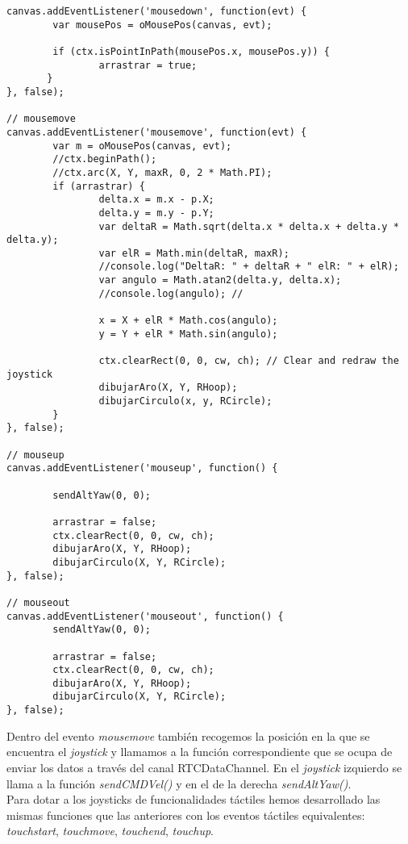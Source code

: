 \begin{lstlisting}[caption=Movimiento y control del joystick.]
canvas.addEventListener('mousedown', function(evt) {
        var mousePos = oMousePos(canvas, evt);

        if (ctx.isPointInPath(mousePos.x, mousePos.y)) {
                arrastrar = true;
       }
}, false);

// mousemove 
canvas.addEventListener('mousemove', function(evt) {
        var m = oMousePos(canvas, evt);
        //ctx.beginPath();
        //ctx.arc(X, Y, maxR, 0, 2 * Math.PI);
        if (arrastrar) {
                delta.x = m.x - p.X;
                delta.y = m.y - p.Y;
                var deltaR = Math.sqrt(delta.x * delta.x + delta.y * delta.y);
                var elR = Math.min(deltaR, maxR);
                //console.log("DeltaR: " + deltaR + " elR: " + elR);
                var angulo = Math.atan2(delta.y, delta.x);
                //console.log(angulo); //
                
                x = X + elR * Math.cos(angulo);
                y = Y + elR * Math.sin(angulo);
                
                ctx.clearRect(0, 0, cw, ch); // Clear and redraw the joystick
                dibujarAro(X, Y, RHoop);
                dibujarCirculo(x, y, RCircle);
        }
}, false);

// mouseup 
canvas.addEventListener('mouseup', function() {
        
        sendAltYaw(0, 0);
        
        arrastrar = false;
        ctx.clearRect(0, 0, cw, ch);
        dibujarAro(X, Y, RHoop);
        dibujarCirculo(X, Y, RCircle);
}, false);

// mouseout 
canvas.addEventListener('mouseout', function() {
        sendAltYaw(0, 0);
        
        arrastrar = false;
        ctx.clearRect(0, 0, cw, ch);
        dibujarAro(X, Y, RHoop);
        dibujarCirculo(X, Y, RCircle);
}, false);
\end{lstlisting}

Dentro del evento \emph{mousemove} también recogemos la posición en la que se encuentra el \emph{joystick} y llamamos a la función correspondiente que se ocupa de enviar los datos a través del canal RTCDataChannel. En el \emph{joystick} izquierdo se llama a la función \emph{sendCMDVel()} y en el de la derecha \emph{sendAltYaw()}.\\

Para dotar a los joysticks de funcionalidades táctiles hemos desarrollado las mismas funciones que las anteriores con los eventos táctiles equivalentes: \emph{touchstart}, \emph{touchmove}, \emph{touchend}, \emph{touchup}.\\

